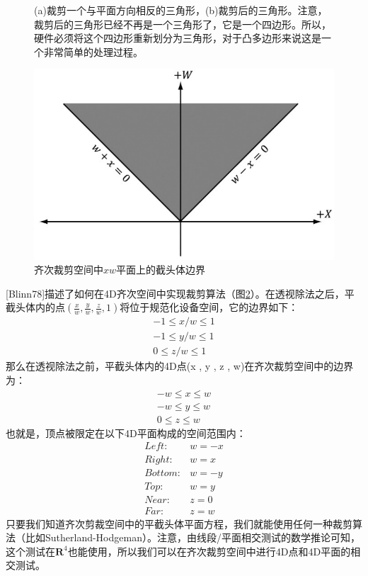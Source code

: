 \documentclass[11pt,a4paper,oldfontcommands]{memoir}
\begin{document}
{\begin{flushleft}
\begin{figure}[h]
    \centering
    \caption{(a)裁剪一个与平面方向相反的三角形，(b)裁剪后的三角形。注意，裁剪后的三角形已经不再是一个三角形了，它是一个四边形。所以，硬件必须将这个四边形重新划分为三角形，对于凸多边形来说这是一个非常简单的处理过程。}
    \label{fig:5-28}
\end{figure}
\begin{figure}[h]
	\includegraphics[width=\textwidth]{5-29}
	\centering
	\caption{齐次裁剪空间中$xw$平面上的截头体边界}
	\label{fig:5-29}
\end{figure}
[Blinn78]描述了如何在4D齐次空间中实现裁剪算法（图\ref{fig:5-29}）。在透视除法之后，平截头体内的点$ (\frac{x}{w},\frac{y}{w},\frac{z}{w},1) $将位于规范化设备空间，它的边界如下：
\begin{align*}
-1\leq x/w \leq 1\\
-1\leq y/w \leq 1\\
0 \leq z/w \leq 1
\end{align*}
那么在透视除法之前，平截头体内的4D点(x , y , z , w)在齐次裁剪空间中的边界为：
\begin{align*}
-w\leq x \leq w\\
-w\leq y \leq w\\
0 \leq z \leq w
\end{align*}
也就是，顶点被限定在以下4D平面构成的空间范围内：
\begin{align*}
\mathit{Left:}&w=-x\\
\mathit{Right:}&w=x\\
\mathit{Bottom:}&w=-y\\
\mathit{Top:}&w=y\\
\mathit{Near:}&z=0\\
\mathit{Far:}&z=w
\end{align*}
只要我们知道齐次剪裁空间中的平截头体平面方程，我们就能使用任何一种裁剪算法（比如Sutherland-Hodgeman）。注意，由线段/平面相交测试的数学推论可知，这个测试在$\mathbf{R}^{4}$也能使用，所以我们可以在齐次裁剪空间中进行4D点和4D平面的相交测试。
\end{flushleft}

}
\end{document}
